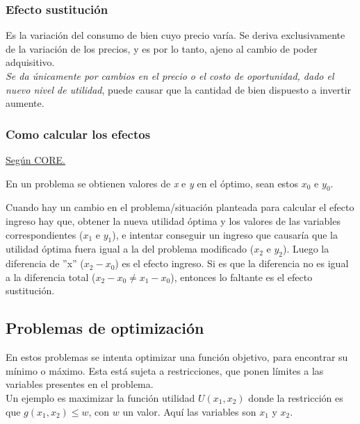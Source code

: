 \subsubsection{Efecto sustitución}
Es la variación del consumo de bien cuyo precio varía. Se deriva exclusivamente de la variación de los precios, y es por lo tanto, ajeno al cambio de poder adquisitivo.
\\

\textit{Se da únicamente por cambios en el precio o el costo de oportunidad, dado el nuevo nivel de utilidad}, puede causar que la cantidad de bien dispuesto a invertir aumente.

\subsubsection{Como calcular los efectos}
\href{https://www.core-econ.org/the-economy/book/es/text/leibniz-03-07-01.html}{Según CORE.\\}


En un problema se obtienen valores de \textit{x} e \textit{y} en el óptimo, sean estos $x_0$ e $y_0$.

Cuando hay un cambio en el problema/situación planteada para calcular el efecto ingreso hay que, obtener la nueva utilidad óptima y los valores de las variables correspondientes ($x_1$ e $y_1$), e intentar conseguir un ingreso que causaría que la utilidad óptima fuera igual a la del problema modificado ($x_2$ e $y_2$). Luego la diferencia de ''x'' ($x_2 - x_0$) es el efecto ingreso. Si es que la diferencia no es igual a la diferencia total ($x_2 - x_0 \neq x_1 - x_0$), entonces lo faltante es el efecto sustitución. 

\subsection{Problemas de optimización}
En estos problemas se intenta optimizar una función objetivo, para encontrar su mínimo o máximo. Esta está sujeta a restricciones, que ponen límites a las variables presentes en el problema. 
\\

Un ejemplo es maximizar la función utilidad $U(x_1,x_2)$ donde la restricción es que $g(x_1,x_2) \leq w$, con $w$ un valor. Aquí las variables son $x_1$ y $x_2$.
\newpage